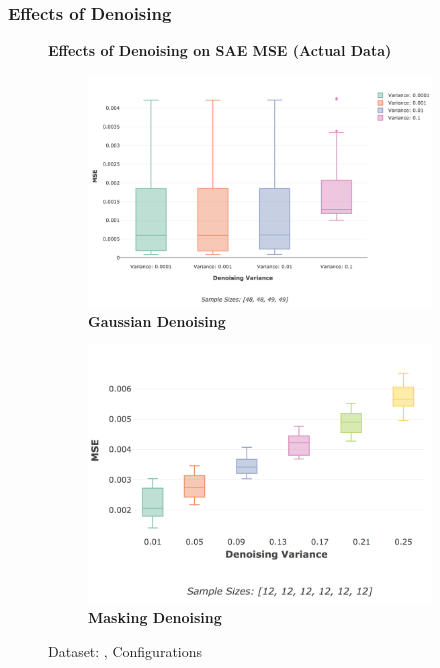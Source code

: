 \documentclass[a4paper,11pt,oneside]{article}
\theoremstyle{plain}
\theoremstyle{definition}
\begin{document}
\subsubsection{Effects of Denoising}

\begin{figure}[H]
	\centering
	\textbf{Effects of Denoising on SAE MSE (Actual Data)}
	\begin{subfigure}{.5\textwidth}
		\centering 
		\includegraphics[scale=0.24]{images/results/network/denoising/actual_mse_gaussian.png}
		\caption{\textbf{Gaussian Denoising} 
			\newline }
		\label{figure-actual_mse_gaussian}
	\end{subfigure}%
	\begin{subfigure}{.5\textwidth}
		\centering 
		\includegraphics[scale=0.24]{images/results/network/denoising/actual_mse_masking.png}
		\caption{\textbf{Masking Denoising} 
			\newline }
		\label{figure-actual_mse_masking}
	\end{subfigure}
	\caption{Dataset: , Configurations
		\newline }
	\label{figure-results_mse_denoising}
\end{figure}
\end{document}
